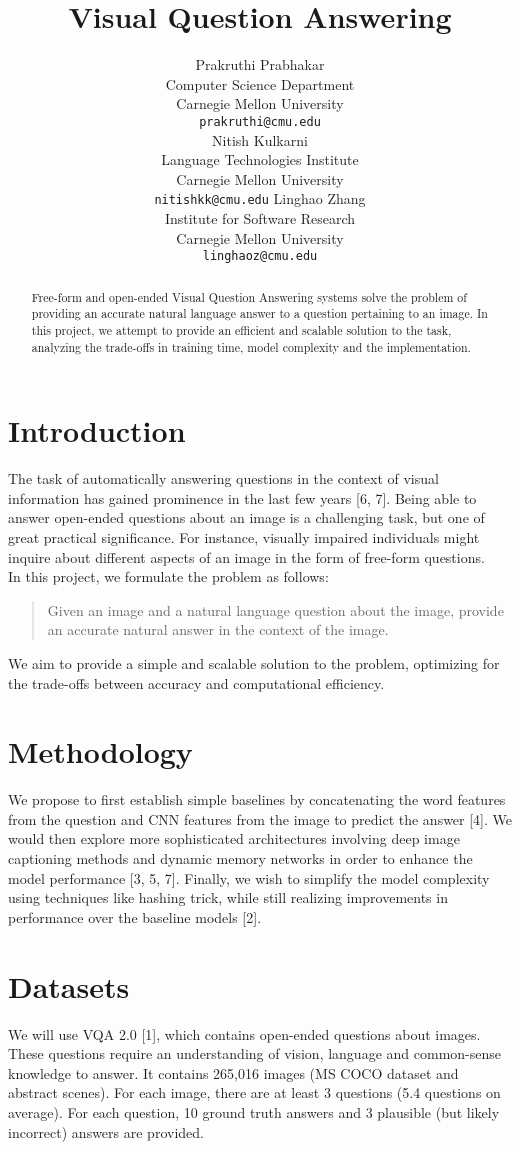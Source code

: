 \documentclass{article}
\title{Visual Question Answering}
\author{
  Prakruthi Prabhakar\\
  Computer Science Department\\
  Carnegie Mellon University\\
  \texttt{prakruthi@cmu.edu} \\
  \And
  Nitish Kulkarni\\
  Language Technologies Institute\\
  Carnegie Mellon University\\
  \texttt{nitishkk@cmu.edu}
  \And
  Linghao Zhang\\
  Institute for Software Research\\
  Carnegie Mellon University\\
  \texttt{linghaoz@cmu.edu}
}
\begin{document}
\maketitle

\begin{abstract}
	Free-form and open-ended Visual Question Answering systems solve the problem of providing an accurate natural language answer to a question pertaining to an image. In this project, we attempt to provide an efficient and scalable solution to the task, analyzing the trade-offs in training time, model complexity and the implementation.
\end{abstract}

\section{Introduction}
The task of automatically answering questions in the context of visual information has gained prominence in the last few years [6, 7]. Being able to answer open-ended questions about an image is a challenging task, but one of great practical significance. For instance, visually impaired individuals might inquire about different aspects of an image in the form of free-form questions.\\
In this project, we formulate the problem as follows:
\begin{quotation}
Given an image and a natural language question about the image, provide an accurate natural answer in the context of the image.
\end{quotation}
We aim to provide a simple and scalable solution to the problem, optimizing for the trade-offs between accuracy and computational efficiency. 

\section{Methodology}

We propose to first establish simple baselines by concatenating the word features from the question and CNN features from the image to predict the answer [4]. We would then explore more sophisticated architectures involving deep image captioning methods and dynamic memory networks in order to enhance the model performance [3, 5, 7]. Finally, we wish to simplify the model complexity using techniques like hashing trick, while still realizing improvements in performance over the baseline models [2].

\section{Datasets}
We will use VQA 2.0 [1], which contains open-ended questions about images. These questions require an understanding of vision, language and common-sense knowledge to answer. It contains 265,016 images (MS COCO dataset and abstract scenes). For each image, there are at least 3 questions (5.4 questions on average). For each question, 10 ground truth answers and 3 plausible (but likely incorrect) answers are provided.
\end{document}
